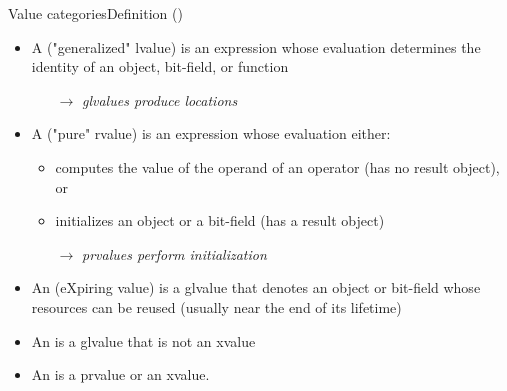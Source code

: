 \begin{frame}{Value categories}{Definition ()}
  \begin{definitions}
    \begin{itemize}
    \item
      A  ("generalized" lvalue) is an expression whose evaluation determines the identity of an object, bit-field, or function
      \begin{itemize}
      \item[$\to$]
        \emph{glvalues produce locations}
      \end{itemize}
    \item
      A  ("pure" rvalue) is an expression whose evaluation either:
      \begin{itemize}
      \item
        computes the value of the operand of an operator (has no result object), or
      \item
        initializes an object or a bit-field (has a result object)
      \item[$\to$]
        \emph{prvalues perform initialization}
      \end{itemize}
    \item
      An  (eXpiring value) is a glvalue that denotes an object or bit-field whose resources can be reused (usually near the end of its lifetime)
    \item
      An  is a glvalue that is not an xvalue
    \item
      An  is a prvalue or an xvalue.
    \end{itemize}
  \end{definitions}
\end{frame}

